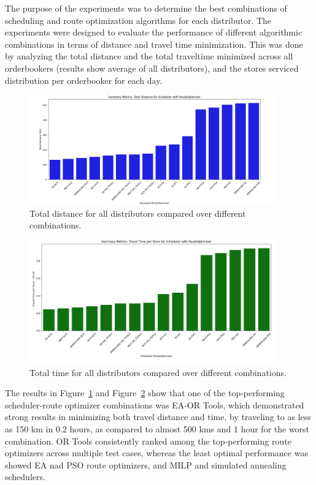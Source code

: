 The purpose of the experiments was to determine the best combinations of scheduling and route optimization algorithms for each distributor. The experiments were designed to evaluate the performance of different algorithmic combinations in terms of distance and travel time minimization.
This was done by analyzing the total distance and the total traveltime minimized across all orderbookers (results show average of all distributors), and the stores serviced distribution per orderbooker for each day.

\begin{figure}[H]
    \centering
    \includegraphics[width=0.95\textwidth]{images/results_distance_all_dis}
    \caption{Total distance for all distributors compared over different combinations.}
    \label{fig:results_distance_all_dis}
\end{figure}

\begin{figure}[H]
    \centering
    \includegraphics[width=0.95\textwidth]{images/results_time_all_dis}
    \caption{Total time for all distributors compared over different combinations.}
    \label{fig:results_time_all_dis}
\end{figure}

The results in Figure~\ref{fig:results_distance_all_dis} and Figure~\ref{fig:results_time_all_dis} show that one of the top-performing scheduler-route optimizer combinations was EA-OR Tools, which demonstrated strong results in minimizing both travel distance and time, by traveling 
to as less as 150 km in 0.2 hours, as compared to almost 500 kms and 1 hour for the worst combination. OR Tools consistently ranked among the top-performing route optimizers across multiple test cases, whereas the least optimal performance was showed EA nad PSO route optimizers, 
and MILP and simulated annealing schedulers.


